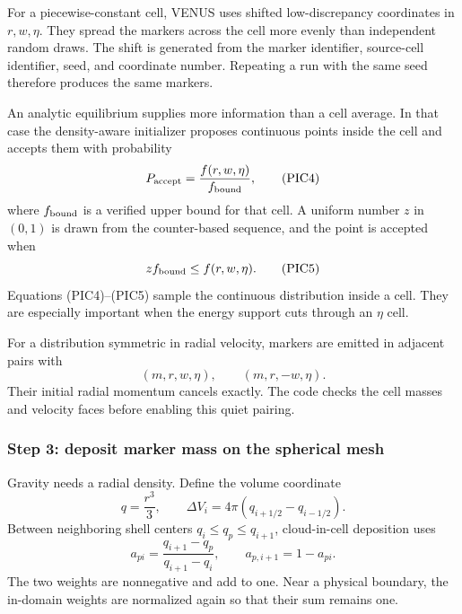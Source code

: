 For a piecewise-constant cell, VENUS uses shifted low-discrepancy coordinates
in \(r,w,\eta\).  They spread the markers across the cell more evenly than
independent random draws.  The shift is generated from the marker identifier,
source-cell identifier, seed, and coordinate number.  Repeating a run with the
same seed therefore produces the same markers.

An analytic equilibrium supplies more information than a cell average.  In
that case the density-aware initializer proposes continuous points inside the
cell and accepts them with probability
\[
 P_{\rm accept}=\frac{f(r,w,\eta)}{f_{\rm bound}},        \tag{PIC4}
\]
where \(f_{\rm bound}\) is a verified upper bound for that cell.  A uniform
number \(z\) in \((0,1)\) is drawn from the counter-based sequence, and the
point is accepted when
\[
 z f_{\rm bound}\leq f(r,w,\eta).                        \tag{PIC5}
\]
Equations (PIC4)--(PIC5) sample the continuous distribution inside a cell.
They are especially important when the energy support cuts through an
\(\eta\) cell.

For a distribution symmetric in radial velocity, markers are emitted in
adjacent pairs with
\[
 (m,r,w,\eta),\qquad(m,r,-w,\eta).                       \tag{PIC6}
\]
Their initial radial momentum cancels exactly.  The code checks the cell
masses and velocity faces before enabling this quiet pairing.

\subsubsection{Step 3: deposit marker mass on the spherical mesh}

Gravity needs a radial density.  Define the volume coordinate
\[
 q=\frac{r^3}{3},\qquad
 \Delta V_i=4\pi(q_{i+1/2}-q_{i-1/2}).                  \tag{PIC7}
\]
Between neighboring shell centers \(q_i\leq q_p\leq q_{i+1}\), cloud-in-cell
deposition uses
\[
 a_{pi}=\frac{q_{i+1}-q_p}{q_{i+1}-q_i},\qquad
 a_{p,i+1}=1-a_{pi}.                                    \tag{PIC8}
\]
The two weights are nonnegative and add to one.  Near a physical boundary,
the in-domain weights are normalized again so that their sum remains one.

